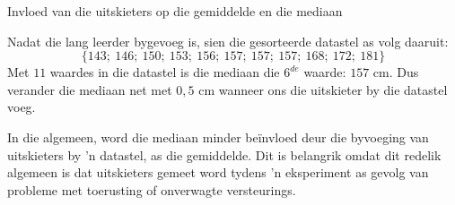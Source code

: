 \begin{wex}{Invloed van die uitskieters op die gemiddelde en die mediaan}
{  

  Nadat die lang leerder bygevoeg is, sien die gesorteerde datastel as volg daaruit:
  \begin{equation*}
    \{143;\ 146;\ 150;\ 153;\ 156;\ 157;\ 157;\ 157;\ 168;\ 172;\ 181\}
  \end{equation*}
  Met $11$ waardes in die datastel is die mediaan die $6^{de}$ waarde: $157$ cm.
  Dus verander die mediaan net met $0,5$ cm wanneer ons die uitskieter by die datastel voeg.

 In die algemeen, word die mediaan minder beïnvloed deur die byvoeging van uitskieters by ’n datastel, as die gemiddelde. Dit is belangrik omdat dit redelik algemeen is dat uitskieters gemeet word tydens ’n eksperiment as gevolg van probleme met toerusting of onverwagte versteurings.
}
\end{wex}

